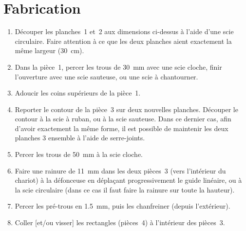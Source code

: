 \documentclass[a4paper,oneside]{article}
\begin{document}
\newpage

\section{Fabrication}

\begin{enumerate}
\item Découper les planches~1 et~2 aux dimensions ci-dessus à l'aide d'une scie circulaire.
Faire attention à ce que les deux planches aient exactement la même largeur (30~cm).
\item Dans la pièce~1, percer les trous de 30~mm avec une scie cloche, finir l'ouverture avec une scie sauteuse, ou une scie à chantourner.
\item Adoucir les coins supérieurs de la pièce~1.
\item Reporter le contour de la pièce~3 sur deux nouvelles planches.
Découper le contour à la scie à ruban, ou à la scie sauteuse.
Dans ce dernier cas, afin d'avoir exactement la même forme, il est possible de maintenir les deux planches 3 ensemble à l'aide de serre-joints.
\item Percer les trous de 50~mm à la scie cloche.
\item Faire une rainure de 11~mm dans les deux pièces~3 (vers l'intérieur du chariot) à la défonceuse en déplaçant progressivement le guide linéaire, ou à la scie circulaire (dans ce cas il faut faire la rainure sur toute la hauteur).
\item Percer les pré-trous en 1.5~mm, puis les chanfreiner (depuis l'extérieur).


\item Coller [et/ou visser] les rectangles (pièces~4) à l'intérieur des pièces~3.

\begin{figure}[!h]
\captionsetup[subfigure]{labelformat=empty}
\end{figure}
\end{enumerate}
\end{document}
